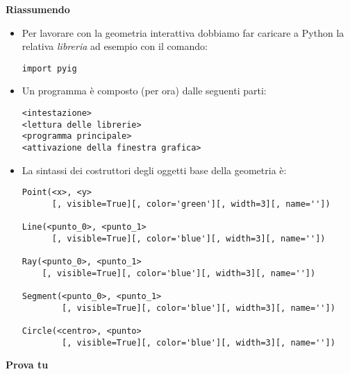 \textbf{Riassumendo}
\begin{itemize} [noitemsep]
\item Per lavorare con la geometria interattiva dobbiamo far caricare a Python
la relativa \emph{libreria} ad esempio con il comando:

\begin{lstlisting}
import pyig
\end{lstlisting}

\item Un programma è composto (per ora) dalle seguenti parti:

\begin{lstlisting}
<intestazione>
<lettura delle librerie>
<programma principale>
<attivazione della finestra grafica>
\end{lstlisting}

\item La sintassi dei costruttori degli oggetti base della geometria è:

\begin{lstlisting}
Point(<x>, <y>
      [, visible=True][, color='green'][, width=3][, name=''])

Line(<punto_0>, <punto_1>
      [, visible=True][, color='blue'][, width=3][, name=''])

Ray(<punto_0>, <punto_1>
    [, visible=True][, color='blue'][, width=3][, name=''])

Segment(<punto_0>, <punto_1>
        [, visible=True][, color='blue'][, width=3][, name=''])
    
Circle(<centro>, <punto>
        [, visible=True][, color='blue'][, width=3][, name=''])
\end{lstlisting}

\end{itemize}

\textbf{Prova tu}

